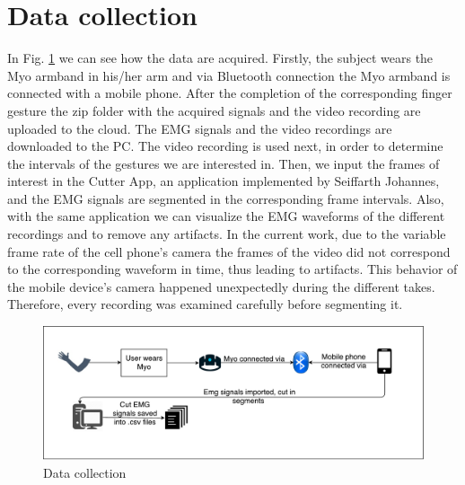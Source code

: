 \section{Data collection}
In Fig. \ref{fig:data_collection} we can see how the data are acquired. Firstly, the subject wears the Myo armband in his/her arm and via Bluetooth connection the Myo armband is connected with a mobile phone. After the completion of the corresponding finger gesture the zip folder with the acquired signals and the video recording are uploaded to the cloud. The \ac{EMG} signals and the video recordings are downloaded to the PC. The video recording is used next, in order to determine the intervals of the gestures we are interested in. Then, we input the frames of interest in the Cutter App, an application implemented by Seiffarth Johannes, and the \ac{EMG} signals are segmented in the corresponding frame intervals. Also, with the same application we can visualize the \ac{EMG} waveforms of the different recordings and to remove any artifacts. In the current work, due to the variable frame rate of the cell phone's camera the frames of the video did not correspond to the corresponding waveform in time, thus leading to artifacts. This behavior of the mobile device's camera happened unexpectedly during the different takes. Therefore, every recording was examined carefully before segmenting it.
\begin{figure}[h!]
\includegraphics[width=15cm,left,keepaspectratio]{figures/data_collection}
\caption{Data collection}
\label{fig:data_collection}
\end{figure}
